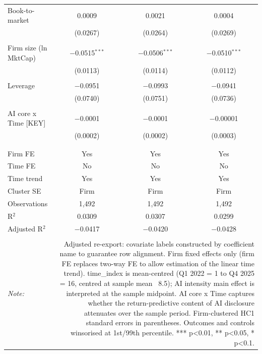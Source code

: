 \begin{table}[!htbp]
\begin{tabular}{@{\extracolsep{5pt}}lccc}
 Book-to-market & 0.0009 & 0.0021 & 0.0004 \\ 
  & (0.0267) & (0.0264) & (0.0269) \\ 
  & & & \\ 
 Firm size (ln MktCap) & $-$0.0515$^{***}$ & $-$0.0506$^{***}$ & $-$0.0510$^{***}$ \\ 
  & (0.0113) & (0.0114) & (0.0112) \\ 
  & & & \\ 
 Leverage & $-$0.0951 & $-$0.0993 & $-$0.0941 \\ 
  & (0.0740) & (0.0751) & (0.0736) \\ 
  & & & \\ 
 AI core x Time  [KEY] & $-$0.0001 & $-$0.0001 & $-$0.00001 \\ 
  & (0.0002) & (0.0002) & (0.0003) \\ 
  & & & \\ 
\hline \\[-1.8ex] 
Firm FE & Yes & Yes & Yes \\ 
Time FE & No & No & No \\ 
Time trend & Yes & Yes & Yes \\ 
Cluster SE & Firm & Firm & Firm \\ 
Observations & 1,492 & 1,492 & 1,492 \\ 
R$^{2}$ & 0.0309 & 0.0307 & 0.0299 \\ 
Adjusted R$^{2}$ & $-$0.0417 & $-$0.0420 & $-$0.0428 \\ 
\hline 
\hline \\[-1.8ex] 
\textit{Note:}  & \multicolumn{3}{r}{Adjusted re-export: covariate labels constructed by coefficient name to guarantee row alignment. Firm fixed effects only (firm FE replaces two-way FE to allow estimation of the linear time trend). time_index is mean-centred (Q1 2022 = 1 to Q4 2025 = 16, centred at sample mean ~8.5); AI intensity main effect is interpreted at the sample midpoint. AI core x Time captures whether the return-predictive content of AI disclosure attenuates over the sample period. Firm-clustered HC1 standard errors in parentheses. Outcomes and controls winsorised at 1st/99th percentile. *** p<0.01, ** p<0.05, * p<0.1.} \\ 
\end{tabular} 
\end{table} 
